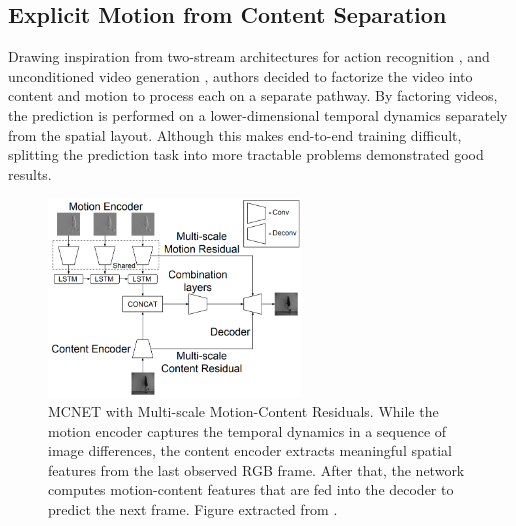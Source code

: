 \subsection{Explicit Motion from Content Separation}
\label{subsc:two_stream}
Drawing inspiration from two-stream architectures for action recognition \cite{Simonyan2014}, and unconditioned video generation \cite{Tulyakov2018}, authors decided to factorize the video into content and motion to process each on a separate pathway. By factoring videos, the prediction is performed on a lower-dimensional temporal dynamics separately from the spatial layout. Although this makes end-to-end training difficult, splitting the prediction task into more tractable problems demonstrated good results. 
\begin{figure}[!tbp]
	\centering
	\includegraphics[width=0.6\textwidth]{figures/videoprediction/methods/mcnet.png}
	\caption{\acf{MCNET} with Multi-scale Motion-Content Residuals. While the motion encoder captures the temporal dynamics in a sequence of image differences, the content encoder extracts meaningful spatial features from the last observed RGB frame. After that, the network computes motion-content features that are fed into the decoder to predict the next frame. Figure extracted from \cite{Villegas2017a}.}
	\label{fig:mcnet}
\end{figure}

